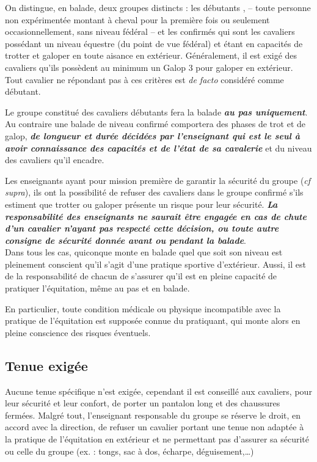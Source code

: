 \documentclass[11pt,a4paper]{article}
\renewcommand{\emph}[1]{\textit{\textbf{#1}}}
\begin{document}
      On distingue, en balade, deux groupes distincts : les \og débutants \fg{}, -- toute personne non expérimentée montant à cheval pour la première fois ou seulement occasionnellement, sans niveau fédéral -- et les \og confirmés \fg{} qui sont les cavaliers possédant un niveau équestre (du point de vue fédéral) et étant en capacités de trotter et galoper en toute aisance en extérieur.
      Généralement, il est exigé des cavaliers qu'ils possèdent au minimum un Galop 3 pour galoper en extérieur.
      Tout cavalier ne répondant pas à ces critères est \textit{de facto} considéré comme débutant.

      Le groupe constitué des cavaliers débutants fera la balade \emph{au pas uniquement}.
      Au contraire une balade de niveau confirmé comportera des phases de trot et de galop, \emph{de longueur et durée décidées par l'enseignant qui est le seul à avoir connaissance des capacités et de l'état de sa cavalerie} et du niveau des cavaliers qu'il encadre.

      Les enseignants ayant pour mission première de garantir la sécurité du groupe (\textit{cf supra}), ils ont la possibilité de refuser des cavaliers dans le groupe confirmé s'ils estiment que trotter ou galoper présente un risque pour leur sécurité. \emph{La responsabilité des enseignants ne saurait être engagée en cas de chute d'un cavalier n'ayant pas respecté cette décision, ou toute autre consigne de sécurité donnée avant ou pendant la balade}.
      \\

      Dans tous les cas, quiconque monte en balade quel que soit son niveau est pleinement conscient qu'il s'agit d'une pratique sportive d'extérieur.
      Aussi, il est de la responsabilité de chacun de s'assurer qu'il est en pleine capacité de pratiquer l'équitation, même au pas et en balade.

      En particulier, toute condition médicale ou physique incompatible avec la pratique de l'équitation est supposée connue du pratiquant, qui monte alors en pleine conscience des risques éventuels.

   \subsection*{Tenue exigée}
      Aucune tenue spécifique n'est exigée, cependant il est conseillé aux cavaliers, pour leur sécurité et leur confort, de porter un pantalon long et des chaussures fermées.
      Malgré tout, l'enseignant responsable du groupe se réserve le droit, en accord avec la direction, de refuser un cavalier portant une tenue non adaptée à la pratique de l'équitation en extérieur et ne permettant pas d'assurer sa sécurité ou celle du groupe (ex.
      : tongs, sac à dos, écharpe, déguisement,\dots)
\end{document}
